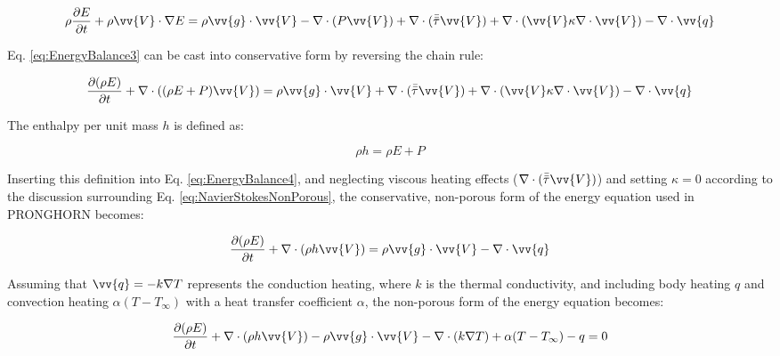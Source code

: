\documentclass[10pt]{article}
\numberwithin{equation}{section} %
\begin{document}
\begin{equation}
\label{eq:EnergyBalance3}
\rho\frac{\partial E}{\partial t}+\rho\vv{V}\cdot\nabla E=\rho \vv{g}\cdot\vv{V}-\nabla\cdot(P\vv{V})+\nabla\cdot(\bar{\bar{\tau}}\vv{V})+\nabla\cdot(\vv{V}\kappa\nabla\cdot\vv{V})-\nabla\cdot\vv{q}
\end{equation}

Eq. \eqref{eq:EnergyBalance3} can be cast into conservative form by reversing the chain rule:

\begin{equation}
\label{eq:EnergyBalance4}
\begin{aligned}
\frac{\partial (\rho E)}{\partial t}+\nabla\cdot((\rho E+P)\vv{V})=\rho \vv{g}\cdot\vv{V}+\nabla\cdot(\bar{\bar{\tau}}\vv{V})+\nabla\cdot(\vv{V}\kappa\nabla\cdot\vv{V})-\nabla\cdot\vv{q}\\
\end{aligned}
\end{equation}

The enthalpy per unit mass \(h\) is defined as:

\begin{equation}
\label{eq:Enthalpy}
\rho h=\rho E +P
\end{equation} %

Inserting this definition into Eq. \eqref{eq:EnergyBalance4}, and neglecting viscous heating effects (\(\nabla\cdot(\bar{\bar{\tau}}\vv{V})\)) and setting \(\kappa=0\) according to the discussion surrounding Eq. \eqref{eq:NavierStokesNonPorous}, the conservative, non-porous form of the energy equation used in PRONGHORN becomes:

\begin{equation}
\label{eq:EnergyBalance5}
\begin{aligned}
\frac{\partial (\rho E)}{\partial t}+\nabla\cdot(\rho h\vv{V})=\rho \vv{g}\cdot\vv{V}-\nabla\cdot\vv{q}\\
\end{aligned}
\end{equation}

Assuming that \(\vv{q}=-k\nabla T\) represents the conduction heating, where \(k\) is the thermal conductivity, and including body heating \(q\) and convection heating \(\alpha(T-T_\infty)\) with a heat transfer coefficient \(\alpha\), the non-porous form of the energy equation becomes:

\begin{equation}
\label{eq:EnergyBalance6}
\begin{aligned}
\frac{\partial (\rho E)}{\partial t}+\nabla\cdot(\rho h\vv{V})-\rho \vv{g}\cdot\vv{V}-\nabla\cdot(k\nabla T)+\alpha(T-T_\infty)-q=0\\
\end{aligned}
\end{equation}
\end{document}
